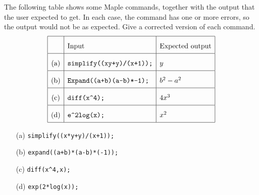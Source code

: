 \documentclass[a4paper]{article}
\begin{document}
\begin{problem}
 The following table shows some Maple commands, together
 with the output that the user expected to get.  In each
 case, the command has one or more errors, so the output
 would not be as expected.  Give a corrected version of each
 command.  
 \[ \renewcommand{\arraystretch}{2}
    \begin{array}{|c|l|l|}
     \hline
      & \mbox{Input} & \mbox{Expected output} \\ \hline
      \mbox{(a)} &
      \verb~simplify((xy+y)/(x+1));~ &
      y \\ \hline
      \mbox{(b)} &
      \verb~Expand((a+b)(a-b)*-1);~ &
      b^2-a^2 \\ \hline
      \mbox{(c)} &
      \verb~diff(x^4);~ &
      4x^3 \\ \hline
      \mbox{(d)} &
      \verb~e^2log(x);~ &
      x^2 \\ \hline
    \end{array}
 \]
\end{problem}
\begin{solution} 
 \begin{itemize}
  \item[(a)] \verb~simplify((x*y+y)/(x+1));~ \hspace{2em}
  \item[(b)] \verb~expand((a+b)*(a-b)*(-1));~ \hspace{2em}
  \item[(c)] \verb~diff(x^4,x);~ \hspace{2em}
  \item[(d)] \verb~exp(2*log(x));~ \hspace{2em}
 \end{itemize}
\end{solution}
\end{document}
